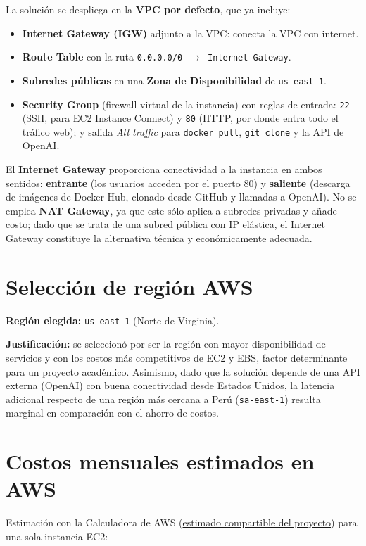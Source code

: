 \documentclass[12pt,letterpaper]{article}
\begin{document}
La soluci\'on se despliega en la \textbf{VPC por defecto}, que ya incluye:

\begin{itemize}[leftmargin=1.2cm]
  \item \textbf{Internet Gateway (IGW)} adjunto a la VPC: conecta la VPC con internet.
  \item \textbf{Route Table} con la ruta \texttt{0.0.0.0/0 $\rightarrow$ Internet Gateway}.
  \item \textbf{Subredes p\'ublicas} en una \textbf{Zona de Disponibilidad} de \texttt{us-east-1}.
  \item \textbf{Security Group} (firewall virtual de la instancia) con reglas de entrada:
        \texttt{22} (SSH, para EC2 Instance Connect) y \texttt{80} (HTTP, por donde entra
        todo el tr\'afico web); y salida \emph{All traffic} para \texttt{docker pull},
        \texttt{git clone} y la API de OpenAI.
\end{itemize}

El \textbf{Internet Gateway} proporciona conectividad a la instancia en ambos
sentidos: \textbf{entrante} (los usuarios acceden por el puerto 80) y
\textbf{saliente} (descarga de im\'agenes de Docker Hub, clonado desde GitHub y
llamadas a OpenAI). No se emplea \textbf{NAT Gateway}, ya que este s\'olo aplica a
subredes privadas y a\~nade costo; dado que se trata de una subred p\'ublica con IP
el\'astica, el Internet Gateway constituye la alternativa t\'ecnica y
econ\'omicamente adecuada.

\section{Selecci\'on de regi\'on AWS}
\textbf{Regi\'on elegida:} \texttt{us-east-1} (Norte de Virginia).

\textbf{Justificaci\'on:} se seleccion\'o por ser la regi\'on con mayor disponibilidad
de servicios y con los costos m\'as competitivos de EC2 y EBS, factor determinante
para un proyecto acad\'emico. Asimismo, dado que la soluci\'on depende de una API
externa (OpenAI) con buena conectividad desde Estados Unidos, la latencia adicional
respecto de una regi\'on m\'as cercana a Per\'u (\texttt{sa-east-1}) resulta marginal
en comparaci\'on con el ahorro de costos.

\section{Costos mensuales estimados en AWS}
Estimaci\'on con la Calculadora de AWS (\href{https://calculator.aws/#/estimate?id=da3c61e3e1e2f9f2d7f04ac764a48c3b14aedeec}{estimado compartible del proyecto}) para una sola
instancia EC2:
\end{document}
